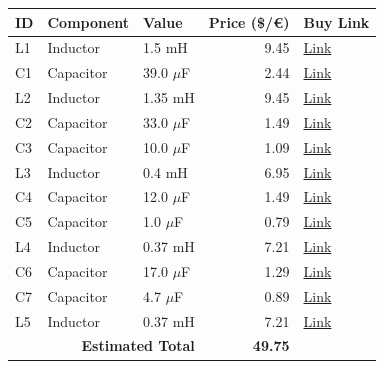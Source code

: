 \begin{table}[H]
    \centering
    \renewcommand{\arraystretch}{1.5}
    \begin{tabular}{@{}lllrl@{}}
        \toprule
        \textbf{ID} & \textbf{Component} & \textbf{Value} & \textbf{Price (\$/€)} & \textbf{Buy Link} \\
        \midrule
        L1 & Inductor & 1.5 mH & 9.45 & \href{https://www.soundimports.eu/en/jantzen-audio-000-2171.html}{Link} \\
        C1 & Capacitor & 39.0 $\mu$F & 2.44 & \href{https://www.soundimports.eu/en/jantzen-audio-001-6156.html}{Link} \\
        L2 & Inductor & 1.35 mH & 9.45 & \href{https://www.soundimports.eu/en/jantzen-audio-000-5420.html}{Link} \\
        C2 & Capacitor & 33.0 $\mu$F & 1.49 & \href{https://www.parts-express.com/33uF-100V-Non-Polarized-Capacitor-027-350}{Link} \\
        C3 & Capacitor & 10.0 $\mu$F & 1.09 & \href{https://www.parts-express.com/10uF-100V-Non-Polarized-Capacitor-027-340}{Link} \\
        L3 & Inductor & 0.4 mH & 6.95 & \href{https://www.soundimports.eu/en/dayton-audio-lw18-40.html}{Link} \\
        C4 & Capacitor & 12.0 $\mu$F & 1.49 & \href{https://www.soundimports.eu/en/jantzen-audio-001-6138.html}{Link} \\
        C5 & Capacitor & 1.0 $\mu$F & 0.79 & \href{https://www.parts-express.com/Dayton-Audio-PMPC-1.0-1.0uF-250V-Precision-Audio-Capacitor-027-210}{Link} \\
        L4 & Inductor & 0.37 mH & 7.21 & \href{https://www.parts-express.com/Jantzen-1117-0.37mH-18-AWG-Air-Core-Inductor-255-222}{Link} \\
        C6 & Capacitor & 17.0 $\mu$F & 1.29 & \href{https://www.parts-express.com/17uF-100V-Non-Polarized-Capacitor-027-346}{Link} \\
        C7 & Capacitor & 4.7 $\mu$F & 0.89 & \href{https://www.parts-express.com/4.7uF-100V-Non-Polarized-Capacitor-027-332}{Link} \\
        L5 & Inductor & 0.37 mH & 7.21 & \href{https://www.parts-express.com/Jantzen-1117-0.37mH-18-AWG-Air-Core-Inductor-255-222}{Link} \\
        \midrule
        \multicolumn{3}{r}{\textbf{Estimated Total}} & \textbf{49.75} & \\
        \bottomrule
    \end{tabular}
\end{table}
